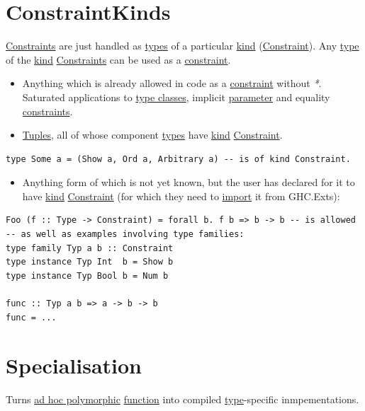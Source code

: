 \documentclass[a4paper,14pt,oneside]{book}
\begin{document}
\chapter{\label{orgb601860}ConstraintKinds}
\label{sec:orgef2d68b}
\hyperref[orgc34edba]{Constraints} are just handled as \hyperref[org6c15f12]{types} of a particular \hyperref[orgd5cf36b]{kind} (\hyperref[org38bf08b]{Constraint}).
Any \hyperref[orgaa4a18b]{type} of the \hyperref[orgd5cf36b]{kind} \hyperref[orgc34edba]{Constraints} can be used as a \hyperref[org38bf08b]{constraint}.
\begin{itemize}
\item Anything which is already allowed in code as a \hyperref[org38bf08b]{constraint} without \emph{*}. Saturated applications to \hyperref[org6ed66c3]{type classes}, implicit \hyperref[org3d261c5]{parameter} and equality \hyperref[orgc34edba]{constraints}.
\item \hyperref[org82261d7]{Tuples}, all of whose component \hyperref[org6c15f12]{types} have \hyperref[orgd5cf36b]{kind} \hyperref[org38bf08b]{Constraint}.
\end{itemize}
\begin{verbatim}
type Some a = (Show a, Ord a, Arbitrary a) -- is of kind Constraint.
\end{verbatim}
\begin{itemize}
\item Anything form of which is not yet known, but the user has declared for it to have \hyperref[orgd5cf36b]{kind} \hyperref[org38bf08b]{Constraint} (for which they need to \hyperref[orgec51cbb]{import} it from GHC.Exts):
\end{itemize}
\begin{verbatim}
Foo (f :: Type -> Constraint) = forall b. f b => b -> b -- is allowed
-- as well as examples involving type families:
type family Typ a b :: Constraint
type instance Typ Int  b = Show b
type instance Typ Bool b = Num b

func :: Typ a b => a -> b -> b
func = ...
\end{verbatim}

\chapter{\label{org674957b}Specialisation}
\label{sec:orgf8fc6b5}
Turns \hyperref[orgd526ab6]{ad hoc polymorphic} \hyperref[org6c914bb]{function} into compiled \hyperref[orgaa4a18b]{type}-specific inmpementations.
\end{document}
